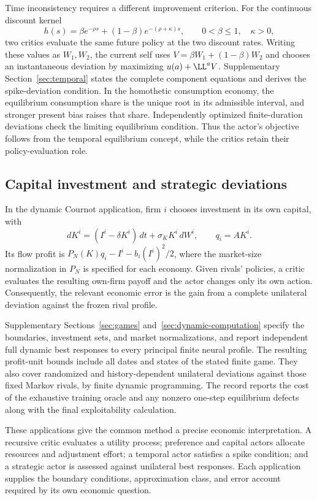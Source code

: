 Time inconsistency requires a different improvement criterion. For the continuous discount kernel
\[
 h(s)=\beta e^{-\rho s}+(1-\beta)e^{-(\rho+\kappa)s},
 \qquad 0<\beta\leq1,\quad\kappa>0,
\]
two critics evaluate the same future policy at the two discount rates. Writing these values as $W_1,W_2$, the current self uses $V=\beta W_1+(1-\beta)W_2$ and chooses an instantaneous deviation by maximizing $u(a)+\LL^a V$. Supplementary Section~\ref{sec:temporal} states the complete component equations and derives the spike-deviation condition. In the homothetic consumption economy, the equilibrium consumption share is the unique root in its admissible interval, and stronger present bias raises that share. Independently optimized finite-duration deviations check the limiting equilibrium condition. Thus the actor's objective follows from the temporal equilibrium concept, while the critics retain their policy-evaluation role.

\subsection{Capital investment and strategic deviations}
In the dynamic Cournot application, firm $i$ chooses investment in its own capital, with
\[
 dK^i=(I^i-\delta K^i)\,dt+\sigma_KK^i\,dW^i,
 \qquad q_i=AK^i.
\]
Its flow profit is $P_N(K)q_i-I^i-b_i(I^i)^2/2$, where the market-size normalization in $P_N$ is specified for each economy. Given rivals' policies, a critic evaluates the resulting own-firm payoff and the actor changes only its own action. Consequently, the relevant economic error is the gain from a complete unilateral deviation against the frozen rival profile.

Supplementary Sections~\ref{sec:games} and~\ref{sec:dynamic-computation} specify the boundaries, investment sets, and market normalizations, and report independent full dynamic best responses to every principal finite neural profile. The resulting profit-unit bounds include all dates and states of the stated finite game. They also cover randomized and history-dependent unilateral deviations against those fixed Markov rivals, by finite dynamic programming. The record reports the cost of the exhaustive training oracle and any nonzero one-step equilibrium defects along with the final exploitability calculation.

These applications give the common method a precise economic interpretation. A recursive critic evaluates a utility process; preference and capital actors allocate resources and adjustment effort; a temporal actor satisfies a spike condition; and a strategic actor is assessed against unilateral best responses. Each application supplies the boundary conditions, approximation class, and error account required by its own economic question.
